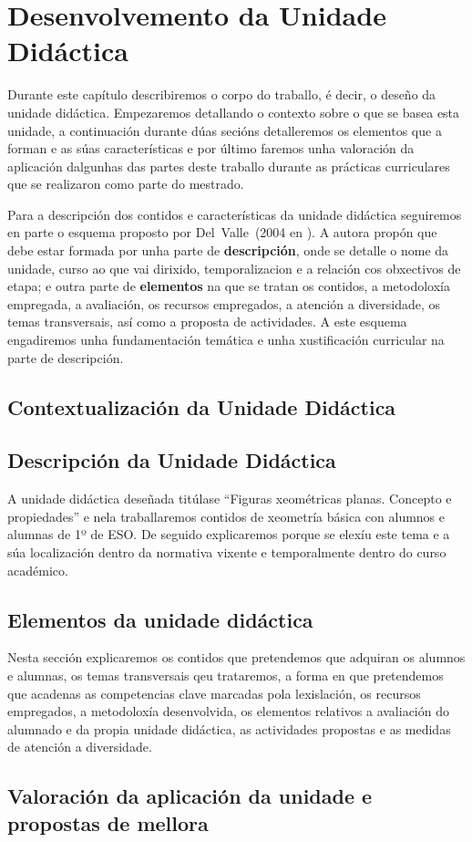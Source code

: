 \chapter{Desenvolvemento da Unidade Didáctica}\label{chap:desenvolvemento}
Durante este capítulo describiremos o corpo do traballo, é decir, o deseño da unidade didáctica. Empezaremos detallando o contexto sobre o que se basea esta unidade, a continuación durante dúas secións detalleremos os elementos que a forman e as súas características e por último faremos unha valoración da aplicación dalgunhas das partes deste traballo durante as prácticas curriculares que se realizaron como parte do mestrado.

Para a descripción dos contidos e características da unidade didáctica seguiremos en parte o esquema proposto por Del~Valle~(2004 en ). A autora propón que debe estar formada por unha parte de \textbf{descripción}, onde se detalle o nome da unidade, curso ao que vai dirixido, temporalizacion e a relación cos obxectivos de etapa; e outra parte de \textbf{elementos} na que se tratan os contidos, a metodoloxía empregada, a avaliación, os recursos empregados, a atención a diversidade, os temas transversais, así como a proposta de actividades. A este esquema engadiremos unha fundamentación temática e unha xustificación curricular na parte de descripción.

\section{Contextualización da Unidade Didáctica}


\section{Descripción da Unidade Didáctica}
A unidade didáctica deseñada titúlase ``Figuras xeométricas planas. Concepto e propiedades'' e nela traballaremos contidos de xeometría básica con alumnos e alumnas de 1º de ESO. De seguido explicaremos porque se elexíu este tema e a súa localización dentro da normativa vixente e temporalmente dentro do curso académico.





\section{Elementos da unidade didáctica}
Nesta sección explicaremos os contidos que pretendemos que adquiran os alumnos e alumnas, os temas transversais qeu trataremos, a forma en que pretendemos que acadenas as competencias clave marcadas pola lexislación, os recursos empregados, a metodoloxía desenvolvida, os elementos relativos a avaliación do alumnado e da propia unidade didáctica, as actividades propostas e as medidas de atención a diversidade.









\section{Valoración da aplicación da unidade e propostas de mellora}

